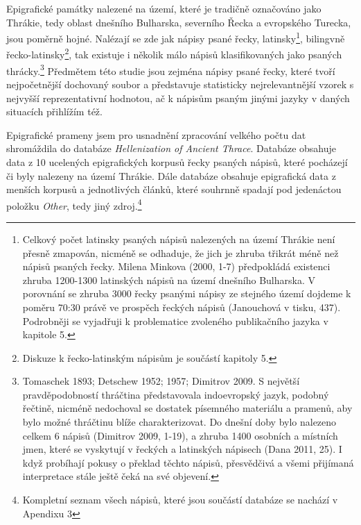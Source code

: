 Epigrafické památky nalezené na území, které je tradičně označováno jako Thrákie, tedy oblast dnešního Bulharska, severního Řecka a evropského Turecka, jsou poměrně hojné. Nalézají se zde jak nápisy psané řecky, latinsky\footnote{Celkový počet latinsky psaných nápisů nalezených na území Thrákie není přesně zmapován, nicméně se odhaduje, že jich je zhruba třikrát méně než nápisů psaných řecky. Milena Minkova (2000, 1-7) předpokládá existenci zhruba 1200-1300 latinských nápisů na území dnešního Bulharska. V porovnání se zhruba 3000 řecky psanými nápisy ze stejného území dojdeme k poměru 70:30 právě ve prospěch řeckých nápisů (Janouchová v tisku, 437). Podrobněji se vyjadřuji k problematice zvoleného publikačního jazyka v kapitole 5.}, bilingvně řecko-latinsky\footnote{Diskuze k řecko-latinským nápisům je součástí kapitoly 5.}, tak existuje i několik málo nápisů klasifikovaných jako psaných thrácky.\footnote{Tomaschek 1893; Detschew 1952; 1957; Dimitrov 2009. S největší pravděpodobností thráčtina představovala indoevropský jazyk, podobný řečtině, nicméně nedochoval se dostatek písemného materiálu a pramenů, aby bylo možné thráčtinu blíže charakterizovat. Do dnešní doby bylo nalezeno celkem 6 nápisů (Dimitrov 2009, 1-19), a zhruba 1400 osobních a místních jmen, které se vyskytují v řeckých a latinských nápisech (Dana 2011, 25). I když probíhají pokusy o překlad těchto nápisů, přesvědčivá a všemi přijímaná interpretace stále ještě čeká na své objevení.} Předmětem této studie jsou zejména nápisy psané řecky, které tvoří nejpočetnější dochovaný soubor a představuje statisticky nejrelevantnější vzorek s nejvyšší reprezentativní hodnotou, ač k nápisům psaným jinými jazyky v daných situacích přihlížím též.

Epigrafické prameny jsem pro usnadnění zpracování velkého počtu dat shromáždila do databáze {\em Hellenization of Ancient Thrace}. Databáze obsahuje data z 10 ucelených epigrafických korpusů řecky psaných nápisů, které pocházejí či byly nalezeny na území Thrákie. Dále databáze obsahuje epigrafická data z menších korpusů a jednotlivých článků, které souhrnně spadají pod jedenáctou položku {\em Other}, tedy jiný zdroj.\footnote{Kompletní seznam všech nápisů, které jsou součástí databáze se nachází v Apendixu 3}

